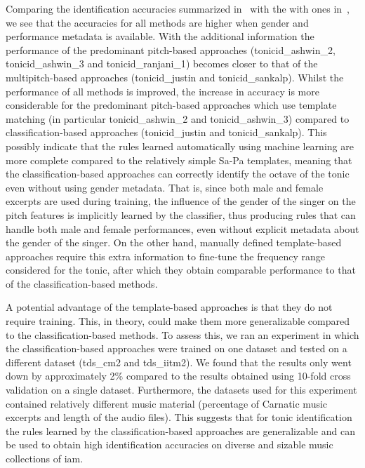 {Comparing the identification accuracies summarized in~ with the with ones in~, we see that the accuracies for all methods are higher when gender and performance metadata is available. With the additional information the performance of the predominant pitch-based approaches (\acrshort{tonicid_ashwin_2}, \acrshort{tonicid_ashwin_3} and \acrshort{tonicid_ranjani_1}) becomes closer to that of the multipitch-based approaches (\acrshort{tonicid_justin} and \acrshort{tonicid_sankalp}). Whilst the performance of all methods is improved, the increase in accuracy is more considerable for the predominant pitch-based approaches which use template matching (in particular \acrshort{tonicid_ashwin_2} and \acrshort{tonicid_ashwin_3}) compared to classification-based approaches (\acrshort{tonicid_justin} and \acrshort{tonicid_sankalp}). This possibly indicate that the rules learned automatically using machine learning are more complete compared to the relatively simple Sa-Pa templates, meaning that the classification-based approaches can correctly identify the octave of the tonic even without using gender metadata. That is, since both male and female excerpts are used during training, the influence of the gender of the singer on the pitch features is implicitly learned by the classifier, thus producing rules that can handle both male and female performances, even without explicit metadata about the gender of the singer. On the other hand, manually defined template-based approaches require this extra information to fine-tune the frequency range
considered for the tonic, after which they obtain comparable performance to that of the classification-based methods.

A potential advantage of the template-based approaches is that they do not require training. This, in theory, could make them more generalizable compared
to the classification-based methods. To assess this, we ran an experiment in which the classification-based approaches were trained on one dataset and tested on a different dataset (\acrshort{tds_cm2} and \acrshort{tds_iitm2}). We found that the results only went down by approximately 2\% compared to the results obtained using 10-fold cross validation on a single dataset. Furthermore, the datasets used for this experiment contained relatively different music material (percentage of Carnatic music excerpts and length of the audio files). This suggests that for tonic identification the rules learned by the classification-based approaches are generalizable and can be used to obtain high identification accuracies on diverse and sizable music collections of \gls{iam}.


}
